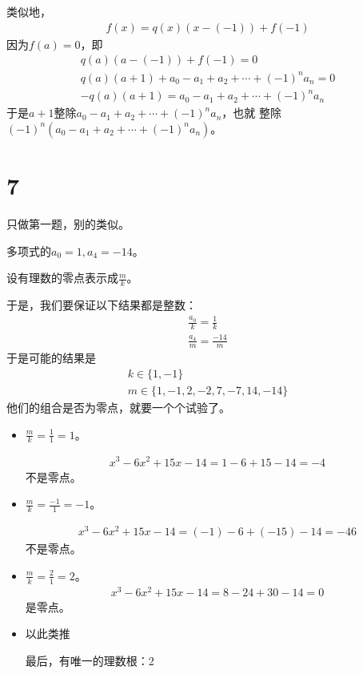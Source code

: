 \documentclass{article}
\begin{document}
类似地，
\begin{align*}
  f(x) = q(x)(x - (-1)) + f(-1)
\end{align*}
因为$f(a) = 0$，即
\begin{align*}
  q(a)(a-(-1)) + f(-1) = 0                                \\
  q(a)(a + 1) + a_0 - a_1 + a_2 + \cdots + (-1)^n a_n = 0 \\
  - q(a)(a + 1) = a_0 - a_1 + a_2 + \cdots + (-1)^n a_n
\end{align*}
于是$a+1$整除$a_0 - a_1 + a_2 + \cdots + (-1)^n a_n$，也就
整除$(-1)^n (a_0 - a_1 + a_2 + \cdots + (-1)^n a_n)$。

\section*{7}
只做第一题，别的类似。

多项式的$a_0 = 1, a_4 = -14$。

设有理数的零点表示成$\frac{m}{k}$。

于是，我们要保证以下结果都是整数：
\begin{align*}
  \frac{a_0}{k} = \frac{1}{k} \\
  \frac{a_4}{m} = \frac{-14}{m}
\end{align*}
于是可能的结果是
\begin{align*}
  k \in \{1, -1\} \\
  m \in \{1, -1, 2, -2, 7, -7, 14, -14\}
\end{align*}
他们的组合是否为零点，就要一个个试验了。

\begin{itemize}
  \item $\frac{m}{k} = \frac{1}{1} = 1$。

        \begin{align*}
          x^3 - 6x^2 + 15x - 14 = 1 - 6 + 15 - 14 = -4
        \end{align*}
        不是零点。

  \item $\frac{m}{k} = \frac{-1}{1} = -1$。

        \begin{align*}
          x^3 - 6x^2 + 15x - 14 = (-1) - 6 + (-15) - 14 = -46
        \end{align*}
        不是零点。

  \item $\frac{m}{k} = \frac{2}{1} = 2$。
        \begin{align*}
          x^3 - 6x^2 + 15x - 14 = 8 - 24 + 30 - 14 = 0
        \end{align*}
        是零点。

  \item 以此类推


        最后，有唯一的理数根：2
\end{itemize}
\end{document}
